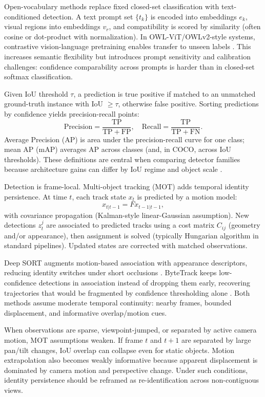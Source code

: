     Open-vocabulary methods replace fixed closed-set classification with text-conditioned detection. A text prompt set \(\{t_k\}\) is encoded into embeddings \(e_k\), visual regions into embeddings
  \(v_r\), and compatibility is scored by similarity (often cosine or dot-product with normalization). In OWL-ViT/OWLv2-style systems, contrastive vision-language pretraining enables transfer to unseen
  labels \cite{minderer_simple_2022,minderer_scaling_2024}. This increases semantic flexibility but introduces prompt sensitivity and calibration challenges: confidence comparability across prompts is
  harder than in closed-set softmax classification.

    Given IoU threshold \(\tau\), a prediction is true positive if matched to an unmatched ground-truth instance with IoU \(\ge\tau\), otherwise false positive. Sorting predictions by confidence yields
  precision-recall points:
  \[
  \mathrm{Precision}=\frac{\mathrm{TP}}{\mathrm{TP}+\mathrm{FP}},\quad
  \mathrm{Recall}=\frac{\mathrm{TP}}{\mathrm{TP}+\mathrm{FN}}.
  \]
  Average Precision (AP) is area under the precision-recall curve for one class; mean AP (mAP) averages AP across classes (and, in COCO, across IoU thresholds). These definitions are central when
  comparing detector families because architecture gains can differ by IoU regime and object scale \cite{foundationsCVbook}.

    Detection is frame-local. Multi-object tracking (MOT) adds temporal identity persistence. At time \(t\), each track state \(x_t\) is predicted by a motion model:
  \[
  x_{t|t-1}=F x_{t-1|t-1},
  \]
  with covariance propagation (Kalman-style linear-Gaussian assumption). New detections \(z_t^j\) are associated to predicted tracks using a cost matrix \(C_{ij}\) (geometry and/or appearance), then
  assignment is solved (typically Hungarian algorithm in standard pipelines). Updated states are corrected with matched observations.

    Deep SORT augments motion-based association with appearance descriptors, reducing identity switches under short occlusions \cite{wojke_simple_2017}. ByteTrack keeps low-confidence detections in
  association instead of dropping them early, recovering trajectories that would be fragmented by confidence thresholding alone \cite{zhang_bytetrack_2022}. Both methods assume moderate temporal
  continuity: nearby frames, bounded displacement, and informative overlap/motion cues.

    When observations are sparse, viewpoint-jumped, or separated by active camera motion, MOT assumptions weaken. If frame \(t\) and \(t+1\) are separated by large pan/tilt changes, IoU overlap can
  collapse even for static objects. Motion extrapolation also becomes weakly informative because apparent displacement is dominated by camera motion and perspective change. Under such conditions,
  identity persistence should be reframed as re-identification across non-contiguous views.

